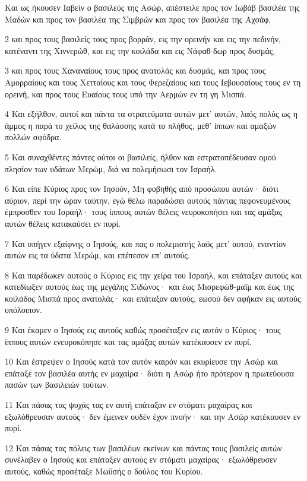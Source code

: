 \par Και ως ήκουσεν Ιαβείν ο βασιλεύς της Ασώρ, απέστειλε προς τον Ιωβάβ βασιλέα της Μαδών και προς τον βασιλέα της Σιμβρών και προς τον βασιλέα της Αχσάφ,
\par 2 και προς τους βασιλείς τους προς βορράν, εις την ορεινήν και εις την πεδινήν, κατέναντι της Χιννερώθ, και εις την κοιλάδα και εις Νάφαθ-δωρ προς δυσμάς,
\par 3 και προς τους Χαναναίους τους προς ανατολάς και δυσμάς, και προς τους Αμορραίους και τους Χετταίους και τους Φερεζαίους και τους Ιεβουσαίους τους εν τη ορεινή, και προς τους Ευαίους τους υπό την Αερμών εν τη γη Μισπά.
\par 4 Και εξήλθον, αυτοί και πάντα τα στρατεύματα αυτών μετ' αυτών, λαός πολύς ως η άμμος η παρά το χείλος της θαλάσσης κατά το πλήθος, μεθ' ίππων και αμαξών πολλών σφόδρα.
\par 5 Και συναχθέντες πάντες ούτοι οι βασιλείς, ήλθον και εστρατοπέδευσαν ομού πλησίον των υδάτων Μερώμ, διά να πολεμήσωσι τον Ισραήλ.
\par 6 Και είπε Κύριος προς τον Ιησούν, Μη φοβηθής από προσώπου αυτών· διότι αύριον, περί την ώραν ταύτην, εγώ θέλω παραδώσει αυτούς πάντας πεφονευμένους έμπροσθεν του Ισραήλ· τους ίππους αυτών θέλεις νευροκοπήσει και τας αμάξας αυτών θέλεις κατακαύσει εν πυρί.
\par 7 Και υπήγεν εξαίφνης ο Ιησούς, και πας ο πολεμιστής λαός μετ' αυτού, εναντίον αυτών εις τα ύδατα Μερώμ, και επέπεσον επ' αυτούς.
\par 8 Και παρέδωκεν αυτούς ο Κύριος εις την χείρα του Ισραήλ, και επάταξεν αυτούς και κατεδίωξεν αυτούς έως της μεγάλης Σιδώνος· και έως Μισρεφώθ-μαΐμ και έως της κοιλάδος Μισπά προς ανατολάς· και επάταξαν αυτούς, εωσού δεν αφήκαν εις αυτούς υπόλοιπον.
\par 9 Και έκαμεν ο Ιησούς εις αυτούς καθώς προσέταξεν εις αυτόν ο Κύριος· τους ίππους αυτών ενευροκόπησε και τας αμάξας αυτών κατέκαυσεν εν πυρί.
\par 10 Και έστρεψεν ο Ιησούς κατά τον αυτόν καιρόν και εκυρίευσε την Ασώρ και επάταξε τον βασιλέα αυτής εν μαχαίρα· διότι η Ασώρ ήτο πρότερον η πρωτεύουσα πασών των βασιλειών τούτων.
\par 11 Και πάσας τας ψυχάς τας εν αυτή επάταξαν εν στόματι μαχαίρας και εξωλόθρευσαν αυτούς· δεν έμεινεν ουδέν έχον πνοήν· και την Ασώρ κατέκαυσεν εν πυρί.
\par 12 Και πάσας τας πόλεις των βασιλέων εκείνων και πάντας τους βασιλείς αυτών συνέλαβεν ο Ιησούς και επάταξεν αυτούς εν στόματι μαχαίρας· εξωλόθρευσεν αυτούς, καθώς προσέταξε Μωϋσής ο δούλος του Κυρίου.
